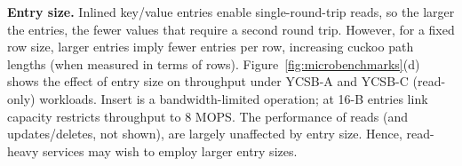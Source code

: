 



\textbf{Entry size.}
\label{sec:entry_size}
Inlined key/value entries enable single-round-trip
reads, so the larger the entries, the fewer values that
require a second round trip.  However, for a fixed row size,
larger entries imply fewer entries per row, increasing
cuckoo path lengths (when measured in terms of rows).
Figure~\ref{fig:microbenchmarks}(d) shows the effect of entry
size on throughput under YCSB-A and YCSB-C (read-only) workloads. Insert is a
bandwidth-limited operation;
at 16-B entries link capacity restricts throughput to 8
MOPS. The performance of reads (and updates/deletes, not
shown), are largely unaffected by entry
size.  Hence,
read-heavy services may wish to
employ larger entry sizes.
%





